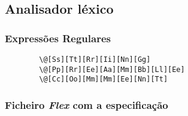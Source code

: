 \subsection{Analisador léxico}
\label{subsec:lexico:desenho}

\subsubsection{Expressões Regulares}
\label{subsec:subsubsec:ers:desenho}

\begin{verbatim}
		\@[Ss][Tt][Rr][Ii][Nn][Gg]
		\@[Pp][Rr][Ee][Aa][Mm][Bb][Ll][Ee]
		\@[Cc][Oo][Mm][Mm][Ee][Nn][Tt]
\end{verbatim}

\subsubsection{Ficheiro \emph{Flex} com a especificação}
\label{subsec:subsubsection:flex:desenho}

